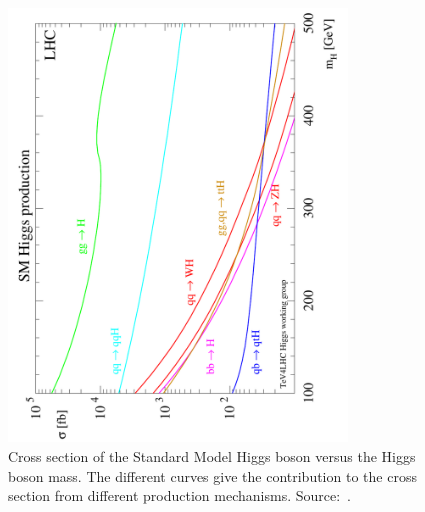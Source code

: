 \begin{figure}
  \centering
  \includegraphics[width=90mm,angle=270]{theory_chapter/figures/lhcxs_mh.pdf}
  \caption[SM Higgs cross sections at the LHC]{Cross section of the Standard
  Model Higgs boson versus the Higgs boson mass.  The different curves give the
  contribution to the cross section from different production mechanisms.
  Source:~\cite{PDG}.}
  \label{fig:LHCSMHiggsXsec}
\end{figure}

